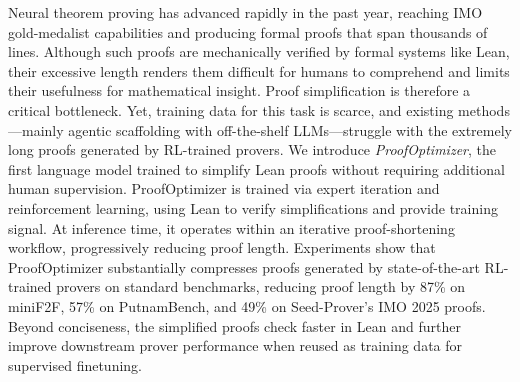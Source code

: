 Neural theorem proving has advanced rapidly in the past year, reaching IMO gold-medalist capabilities and producing formal proofs that span thousands of lines. Although such proofs are mechanically verified by formal systems like Lean, their excessive length renders them difficult for humans to comprehend and limits their usefulness for mathematical insight. Proof simplification is therefore a critical bottleneck. Yet, training data for this task is scarce, and existing methods---mainly agentic scaffolding with off-the-shelf LLMs---struggle with the extremely long proofs generated by RL-trained provers. We introduce \emph{ProofOptimizer}, the first language model trained to simplify Lean proofs without requiring additional human supervision. ProofOptimizer is trained via expert iteration and reinforcement learning, using Lean to verify simplifications and provide training signal. At inference time, it operates within an iterative proof-shortening workflow, progressively reducing proof length. Experiments show that ProofOptimizer substantially compresses proofs generated by state-of-the-art RL-trained provers on standard benchmarks, reducing proof length by 87\% on miniF2F, 57\% on PutnamBench, and 49\% on Seed-Prover's IMO 2025 proofs. Beyond conciseness, the simplified proofs check faster in Lean and further improve downstream prover performance when reused as training data for supervised finetuning.
